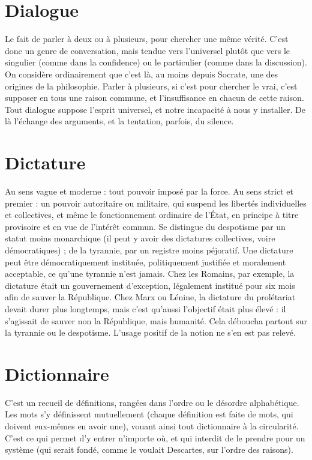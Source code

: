 \section{Dialogue}
Le fait de parler à deux ou à plusieurs, pour chercher une même
vérité. C’est donc un genre de conversation, mais tendue vers
l'universel plutôt que vers le singulier (comme dans la confidence) ou le particulier
(comme dans la discussion). On considère ordinairement que c’est là, au
moins depuis Socrate, une des origines de la philosophie. Parler à plusieurs, si
c’est pour chercher le vrai, c’est supposer en tous une raison commune, et
l'insuffisance en chacun de cette raison. Tout dialogue suppose l'esprit universel,
et notre incapacité à nous y installer. De là l’échange des arguments, et
la tentation, parfois, du silence.

\section{Dictature}
Au sens vague et moderne : tout pouvoir imposé par la force.
Au sens strict et premier : un pouvoir autoritaire ou militaire,
qui suspend les libertés individuelles et collectives, et même le fonctionnement
ordinaire de l’État, en principe à titre provisoire et en vue de l'intérêt commun.
Se distingue du despotisme par un statut moins monarchique (il peut y avoir
des dictatures collectives, voire démocratiques) ; de la tyrannie, par un registre
moins péjoratif. Une dictature peut être démocratiquement instituée, politiquement
justifiée et moralement acceptable, ce qu’une tyrannie n’est jamais.
Chez les Romains, par exemple, la dictature était un gouvernement d’exception,
légalement institué pour six mois afin de sauver la République. Chez
Marx ou Lénine, la dictature du prolétariat devait durer plus longtemps, mais
c'est qu'aussi l’objectif était plus élevé : il s'agissait de sauver non la République,
mais humanité. Cela déboucha partout sur la tyrannie ou le despotisme.
L’usage positif de la notion ne s’en est pas relevé.

\section{Dictionnaire}
C'est un recueil de définitions, rangées dans l’ordre ou le
désordre alphabétique. Les mots s’y définissent mutuellement
(chaque définition est faite de mots, qui doivent eux-mêmes en avoir
une), vouant ainsi tout dictionnaire à la circularité. C’est ce qui permet d’y
entrer n'importe où, et qui interdit de le prendre pour un système (qui serait
fondé, comme le voulait Descartes, sur l’ordre des raisons).

